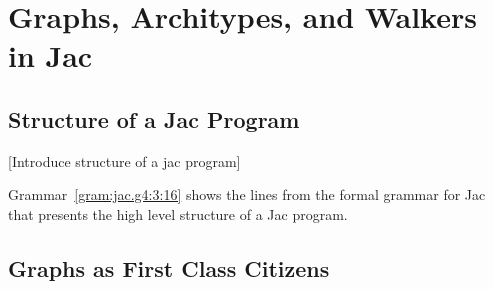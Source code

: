 \chapter{Graphs, Architypes, and Walkers in Jac}



\section{Structure of a Jac Program}

 [Introduce structure of a jac program] \par
[Specify the differnce between graph architypes, graph instantiations, and walkers]\par
[Present simple program that utilizes the structures]\par
[Present variations on articulating the same program]\par
[Code blocks]\par

\begin{nerd}
    Grammar~\ref{gram:jac.g4:3:16} shows the lines from the formal grammar for Jac that presents the high level structure of a Jac program.
\end{nerd}

\section{Graphs as First Class Citizens}

\pagebreak
\par
{}
\par
{}


\pagebreak
\par
{}
\par
{}

\pagebreak
\par
{}
\par
{}

